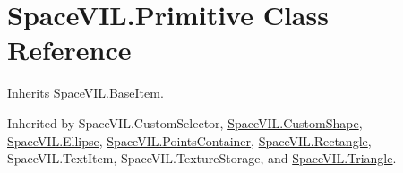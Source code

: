\hypertarget{class_space_v_i_l_1_1_primitive}{}\section{Space\+V\+I\+L.\+Primitive Class Reference}
\label{class_space_v_i_l_1_1_primitive}


Inherits \mbox{\hyperlink{class_space_v_i_l_1_1_base_item}{Space\+V\+I\+L.\+Base\+Item}}.



Inherited by Space\+V\+I\+L.\+Custom\+Selector, \mbox{\hyperlink{class_space_v_i_l_1_1_custom_shape}{Space\+V\+I\+L.\+Custom\+Shape}}, \mbox{\hyperlink{class_space_v_i_l_1_1_ellipse}{Space\+V\+I\+L.\+Ellipse}}, \mbox{\hyperlink{class_space_v_i_l_1_1_points_container}{Space\+V\+I\+L.\+Points\+Container}}, \mbox{\hyperlink{class_space_v_i_l_1_1_rectangle}{Space\+V\+I\+L.\+Rectangle}}, Space\+V\+I\+L.\+Text\+Item, Space\+V\+I\+L.\+Texture\+Storage, and \mbox{\hyperlink{class_space_v_i_l_1_1_triangle}{Space\+V\+I\+L.\+Triangle}}.

